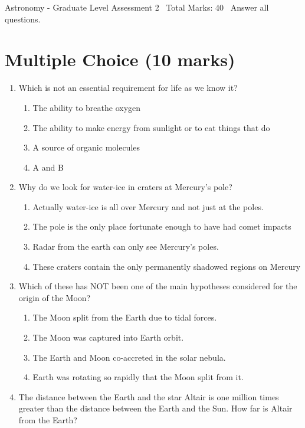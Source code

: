 \documentclass[12pt]{article}
\begin{document}
\begin{center}
Astronomy - Graduate Level Assessment 2 \
Total Marks: 40 \
Answer all questions.
\end{center}

\section*{Multiple Choice (10 marks)}
\begin{enumerate}[label=\arabic*.]
\item Which is not an essential requirement for life as we know it?
\begin{enumerate}[label=(\alph*)]
    \item The ability to breathe oxygen
    \item The ability to make energy from sunlight or to eat things that do
    \item A source of organic molecules
    \item A and B
\end{enumerate}
\item Why do we look for water-ice in craters at Mercury's pole?
\begin{enumerate}[label=(\alph*)]
    \item Actually water-ice is all over Mercury and not just at the poles.
    \item The pole is the only place fortunate enough to have had comet impacts
    \item Radar from the earth can only see Mercury's poles.
    \item These craters contain the only permanently shadowed regions on Mercury
\end{enumerate}
\item Which of these has NOT been one of the main hypotheses considered for the origin of the
Moon?
\begin{enumerate}[label=(\alph*)]
    \item The Moon split from the Earth due to tidal forces.
    \item The Moon was captured into Earth orbit.
    \item The Earth and Moon co-accreted in the solar nebula.
    \item Earth was rotating so rapidly that the Moon split from it.
\end{enumerate}
\item The distance between the Earth and the star Altair is one million times greater than the
distance between the Earth and the Sun. How far is Altair from the Earth?

\end{enumerate}
\end{document}
